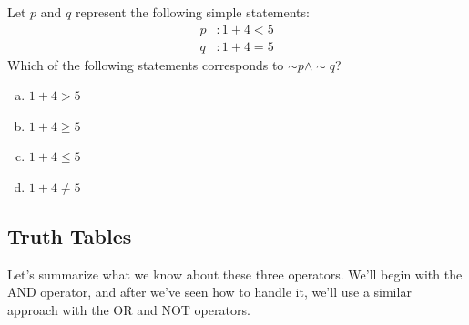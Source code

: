 \begin{try}
Let $p$ and $q$ represent the following simple statements:
\begin{align*}
p &: 1+4<5\\
q &: 1+4=5
\end{align*}
Which of the following statements corresponds to $\sim p \wedge \sim q$?

\begin{enumerate}[(a)]
\item $1+4>5$
\item $1+4 \geq 5$
\item $1+4 \leq 5$
\item $1+4 \neq 5$
\end{enumerate}
\end{try}
\vfill
\pagebreak

\subsection{Truth Tables}
Let's summarize what we know about these three operators.  We'll begin with the AND operator, and after we've seen how to handle it, we'll use a similar approach with the OR and NOT operators.

